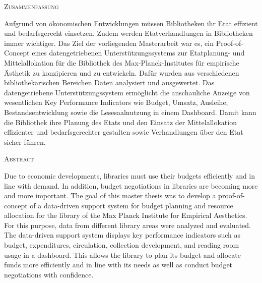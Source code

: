 \begin{center}
    \textsc{Zusammenfassung}
  \end{center}
  \noindent
Aufgrund von ökonomischen Entwicklungen müssen Bibliotheken ihr Etat effizient und bedarfsgerecht einsetzen. 
Zudem werden Etatverhandlungen in Bibliotheken immer wichtiger. 
Das Ziel der vorliegenden Masterarbeit war es, ein Proof-of-Concept eines datengetriebenen Unterstützungssystems zur
Etatplanung- und Mittelallokation für die Bibliothek des Max-Planck-Institutes für empirische Ästhetik zu konzipieren und zu entwickeln.
Dafür wurden aus verschiedenen bibliothekarischen Bereichen Daten analysiert 
und ausgewertet. Das datengetriebene Unterstützungssystem ermöglicht die anschauliche Anzeige von wesentlichen Key Performance Indicators wie Budget, 
Umsatz, Ausleihe, Bestandsentwicklung sowie die Lesesaalnutzung in einem Dashboard.
Damit kann die Bibliothek ihre Planung des Etats und den Einsatz der Mittelallokation effizienter und bedarfsgerechter gestalten
sowie Verhandlungen über den Etat sicher führen.

  

\begin{center}
  \textsc{Abstract}
  \end{center}

  \noindent
  Due to economic developments, libraries must use their budgets efficiently and in line with demand. 
  In addition, budget negotiations in libraries are becoming more and more important. 
  The goal of this master thesis was to develop a proof-of-concept of a data-driven support system for
  budget planning and resource allocation for the library of the Max Planck Institute for Empirical Aesthetics.
  For this purpose, data from different library areas were analyzed and evaluated. The data-driven support system 
  displays key performance indicators such as budget, expenditures, circulation, collection development, and reading room usage in a dashboard. 
  This allows the library to plan its budget and allocate funds more efficiently and in line with its needs
  as well as conduct budget negotiations with confidence.
